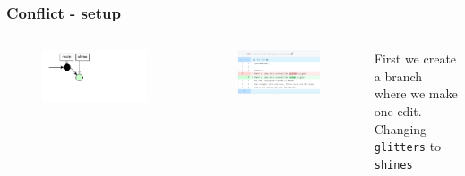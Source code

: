 \documentclass[aspectratio=169]{beamer} %
\begin{document}
\begin{frame}
	\frametitle{Conflict - setup}
	\begin{columns}[c]
		
		\vspace{-.6cm}
		\begin{figure}
			\centering
			\includegraphics[width=.9\textwidth]{./img/conflict-network-setup.png}
		\end{figure}
		\vspace{-.3cm}
		\begin{figure}
			\centering
			\includegraphics[width=.9\textwidth]{./img/conflict-img-setup.png}
		\end{figure}
		

		First we create a branch where we make one edit. 
		Changing \texttt{glitters} to \texttt{shines}
		
	\end{columns}
\end{frame}
\end{document}
